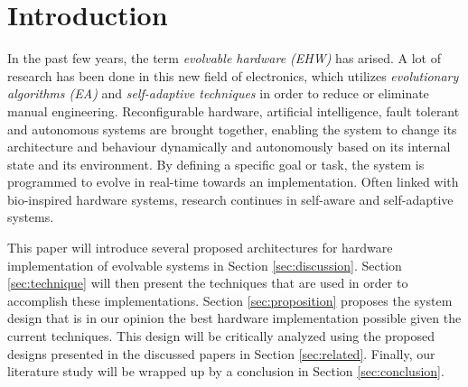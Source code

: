 \section{Introduction}
%
In the past few years, the term \emph{evolvable hardware (EHW)} has arised. A lot of research has been done in this new field of electronics, which utilizes \emph{evolutionary algorithms (EA)} and \emph{self-adaptive techniques}  in order to reduce or eliminate manual engineering. Reconfigurable hardware, artificial intelligence, fault tolerant and autonomous systems are brought together, enabling the system to change its architecture and behaviour dynamically and autonomously based on its internal state and its environment. By defining a specific goal or task, the system is programmed to evolve in real-time towards an implementation. Often linked with bio-inspired hardware systems, research continues in self-aware and self-adaptive systems. 

This paper will introduce several proposed architectures for hardware implementation of evolvable systems in Section \ref{sec:discussion}. Section \ref{sec:technique} will then present the techniques that are used in order to accomplish these implementations. Section \ref{sec:proposition} proposes the system design that is in our opinion the best hardware implementation possible given the current techniques. This design will be critically analyzed using the proposed designs presented in the discussed papers in Section \ref{sec:related}. Finally, our literature study will be wrapped up by a conclusion in Section \ref{sec:conclusion}.